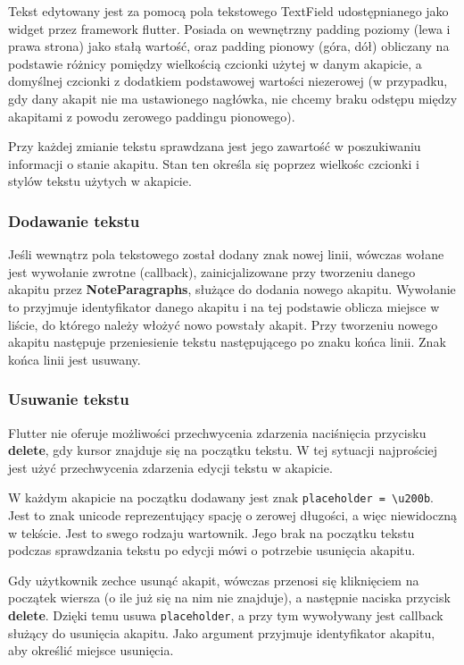 Tekst edytowany jest za pomocą pola tekstowego TextField udostępnianego jako widget przez framework flutter. Posiada on wewnętrzny padding poziomy (lewa i prawa strona) jako stałą wartość, oraz padding pionowy (góra, dół) obliczany na podstawie różnicy pomiędzy wielkością czcionki użytej w danym akapicie, a domyślnej czcionki z dodatkiem podstawowej wartości niezerowej (w przypadku, gdy dany akapit nie ma ustawionego nagłówka, nie chcemy braku odstępu między akapitami z powodu zerowego paddingu pionowego).

Przy każdej zmianie tekstu sprawdzana jest jego zawartość w poszukiwaniu informacji o stanie akapitu. Stan ten określa się poprzez wielkośc czcionki i stylów tekstu użytych w akapicie.

\subsubsection{Dodawanie tekstu}

Jeśli wewnątrz pola tekstowego został dodany znak nowej linii, wówczas wołane jest wywołanie zwrotne (callback), zainicjalizowane przy tworzeniu danego akapitu przez \textbf{NoteParagraphs}, służące do dodania nowego akapitu. Wywołanie to przyjmuje identyfikator danego akapitu i na tej podstawie oblicza miejsce w liście, do którego należy włożyć nowo powstały akapit. Przy tworzeniu nowego akapitu następuje przeniesienie tekstu następującego po znaku końca linii. Znak końca linii jest usuwany.

\subsubsection{Usuwanie tekstu}
\label{eq:usuwanieTekstu}

Flutter nie oferuje możliwości przechwycenia zdarzenia naciśnięcia przycisku \textbf{delete}, gdy kursor znajduje się na początku tekstu. W tej sytuacji najprościej jest użyć przechwycenia zdarzenia edycji tekstu w akapicie.

W każdym akapicie na początku dodawany jest znak \verb|placeholder = \u200b|. Jest to znak unicode reprezentujący spację o zerowej długości, a więc niewidoczną w tekście. Jest to swego rodzaju wartownik. Jego brak na początku tekstu podczas sprawdzania tekstu po edycji mówi o potrzebie usunięcia akapitu.

Gdy użytkownik zechce usunąć akapit, wówczas przenosi się kliknięciem na początek wiersza (o ile już się na nim nie znajduje), a następnie naciska przycisk \textbf{delete}. Dzięki temu usuwa \verb|placeholder|, a przy tym wywoływany jest callback służący do usunięcia akapitu. Jako argument przyjmuje identyfikator akapitu, aby określić miejsce usunięcia.

